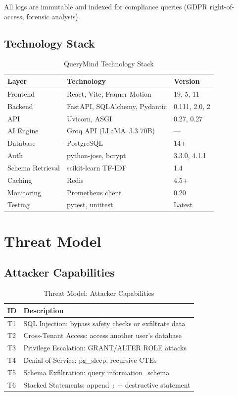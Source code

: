 \documentclass[conference]{IEEEtran}
\begin{document}
All logs are immutable and indexed for compliance queries (GDPR right-of-access, forensic analysis).

\subsection{Technology Stack}

\begin{table}[h]
\caption{QueryMind Technology Stack}
\label{tab:stack}
\centering
\begin{tabular}{lll}
\toprule
\textbf{Layer} & \textbf{Technology} & \textbf{Version} \\
\midrule
Frontend & React, Vite, Framer Motion & 19, 5, 11 \\
Backend & FastAPI, SQLAlchemy, Pydantic & 0.111, 2.0, 2 \\
API & Uvicorn, ASGI & 0.27, 0.27 \\
AI Engine & Groq API (LLaMA~3.3 70B) & --- \\
Database & PostgreSQL & 14+ \\
Auth & python-jose, bcrypt & 3.3.0, 4.1.1 \\
Schema Retrieval & scikit-learn TF-IDF & 1.4 \\
Caching & Redis & 4.5+ \\
Monitoring & Prometheus client & 0.20 \\
Testing & pytest, unittest & Latest \\
\bottomrule
\end{tabular}
\end{table}

\section{Threat Model}

\subsection{Attacker Capabilities}

\begin{table}[h]
\caption{Threat Model: Attacker Capabilities}
\label{tab:threats}
\centering
\begin{tabular}{lp{5.5cm}}
\toprule
\textbf{ID} & \textbf{Description} \\
\midrule
T1 & SQL Injection: bypass safety checks or exfiltrate data \\
T2 & Cross-Tenant Access: access another user's database \\
T3 & Privilege Escalation: GRANT/ALTER ROLE attacks \\
T4 & Denial-of-Service: pg\_sleep, recursive CTEs \\
T5 & Schema Exfiltration: query information\_schema \\
T6 & Stacked Statements: append \texttt{;} + destructive statement \\
\bottomrule
\end{tabular}
\end{table}
\end{document}
